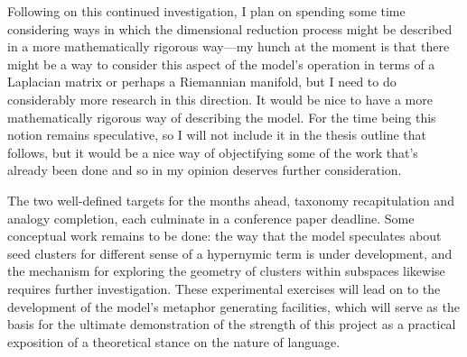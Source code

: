 Following on this continued investigation, I plan on spending some time considering ways in which the dimensional reduction process might be described in a more mathematically rigorous way---my hunch at the moment is that there might be a way to consider this aspect of the model's operation in terms of a Laplacian matrix or perhaps a Riemannian manifold, but I need to do considerably more research in this direction.  It would be nice to have a more mathematically rigorous way of describing the model.  For the time being this notion remains speculative, so I will not include it in the thesis outline that follows, but it would be a nice way of objectifying some of the work that's already been done and so in my opinion deserves further consideration.

The two well-defined targets for the months ahead, taxonomy recapitulation and analogy completion, each culminate in a conference paper deadline.  Some conceptual work remains to be done: the way that the model speculates about seed clusters for different sense of a hypernymic term is under development, and the mechanism for exploring the geometry of clusters within subspaces likewise requires further investigation.  These experimental exercises will lead on to the development of the model's metaphor generating facilities, which will serve as the basis for the ultimate demonstration of the strength of this project as a practical exposition of a theoretical stance on the nature of language.

